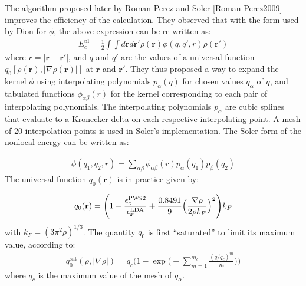 \documentclass[letterpaper,10pt,english]{sphinxmanual}
\begin{document}
The algorithm proposed later by Roman-Perez and Soler
{[}Roman-Perez2009{]} improves the efficiency of the
calculation. They observed that with the form used by Dion  for
\(\phi\), the above expression can be re-written as:
\begin{equation*}
\begin{split}E_{c}^{\mathrm{nl}} = \frac{1}{2}\int\int d{\mathbf{r}}d{\mathbf{r}}'\rho({\mathbf{r}})\phi(q,q',r)\rho({\mathbf{r}}')\end{split}
\end{equation*}
where \(r=|{\mathbf{r}}-{\mathbf{r}}'|\), and \(q\) and
\(q'\) are the values of a universal function
\(q_0[\rho({\mathbf{r}}),|\nabla \rho({\mathbf{r}})|]\) at
\({\mathbf{r}}\) and \({\mathbf{r}}'\). They thus proposed a way
to expand the kernel \(\phi\) using interpolating polynomials
\(p_\alpha(q)\) for chosen values \(q_\alpha\) of \(q\), and
tabulated functions \(\phi_{\alpha\beta}(r)\) for the kernel
corresponding to each pair of interpolating polynomials. The
interpolating polynomials \(p_{\alpha}\) are cubic splines that
evaluate to a Kronecker delta on each respective interpolating point. A
mesh of 20 interpolation points is used in Soler’s implementation. The
Soler form of the nonlocal energy can be written as:

\label{\detokenize{VDW-DF:equation-kernel}}\begin{equation}\label{equation:VDW-DF:kernel}
\begin{split}\phi(q_1,q_2,r) = \sum_{\alpha\beta}\phi_{\alpha\beta}(r) p_{\alpha}(q_1) p_{\beta}(q_2)\end{split}
\end{equation}
The universal function \(q_0({\mathbf{r}})\) is in practice given
by:

\label{\detokenize{VDW-DF:equation-q0}}\begin{equation}\label{equation:VDW-DF:q0}
\begin{split}q_0({\mathbf{r}}) = \Bigg(1 + \frac{\epsilon_c^{\rm{PW92}}}{\epsilon_x^{\rm{LDA}}} +
\frac{0.8491}{9}\Big(\frac{\nabla\rho}{2\rho k_F}\Big)^2\Bigg) k_F\end{split}
\end{equation}
with \(k_F=(3\pi^2\rho)^{1/3}\). The quantity \(q_0\) is first
“saturated” to limit its maximum value, according to:
\begin{equation*}
\begin{split}q_0^{\text{sat}}(\rho,{|\nabla{\rho}|}) = q_c \Bigg(1-\exp\Big(-\sum_{m=1}^{m_c}\frac{(q/q_c)^m}{m}\Big)\Bigg)\end{split}
\end{equation*}
where \(q_c\) is the maximum value of the mesh of
\(q_{\alpha}\).
\end{document}
